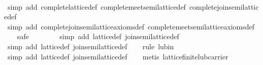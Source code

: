 \begin{isabellebody}
%
\isadelimproof
\ \ %
\endisadelimproof
%
\isatagproof
{}\isamarkupfalse%
\ {}simp\ add{}\ complete{}lattice{}def\ complete{}meet{}semilattice{}def\ complete{}join{}semilattice{}def{}\isanewline
\ \ \isamarkupfalse%
\ {}simp\ add{}\ complete{}join{}semilattice{}axioms{}def\ complete{}meet{}semilattice{}axioms{}def{}\isanewline
\ \ \isamarkupfalse%
\ safe\isanewline
\ \ \isamarkupfalse%
\ {}\isanewline
\ \ \isamarkupfalse%
\ {}simp\ add{}\ lattice{}def\ join{}semilattice{}def{}\isanewline
\ \ \isamarkupfalse%
\ {}simp\ add{}\ lattice{}def\ join{}semilattice{}def{}\isanewline
\ \ \isamarkupfalse%
\ {}rule\ lub{}in{}\isanewline
\ \ \isamarkupfalse%
\ {}simp\ add{}\ lattice{}def\ join{}semilattice{}def{}\isanewline
\ \ \isamarkupfalse%
\ {}metis\ lattice{}finite{}lub{}carrier{}\isanewline

\end{isabellebody}
